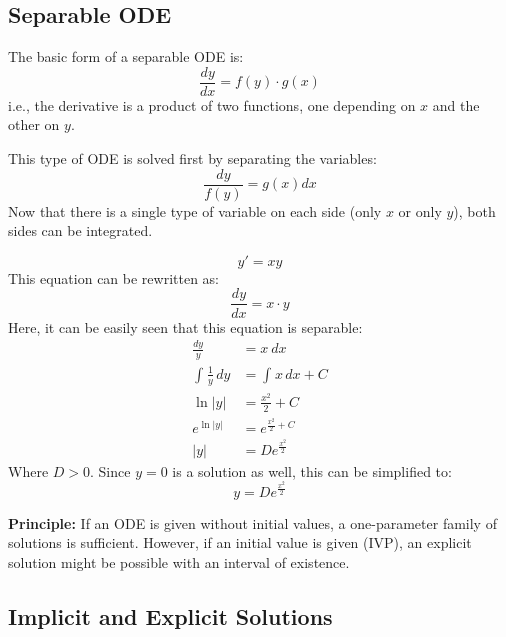 \documentclass[12pt]{article}
\begin{document}
\subsection{Separable ODE}
\label{ssec:separableODE}

The basic form of a separable ODE is:
\begin{equation*}
  \frac{dy}{dx} = f(y) \cdot g(x)
\end{equation*}
i.e., the derivative is a product of two functions, one depending on $x$ and the other on $y$.

This type of ODE is solved first by separating the variables:
\begin{equation*}
  \frac{dy}{f(y)} = g(x) dx
\end{equation*}
Now that there is a single type of variable on each side (only $x$ or only $y$), both sides can be integrated.

\begin{example}
  \begin{equation*}
    y' = xy
  \end{equation*}
  This equation can be rewritten as:
  \begin{equation*}
    \frac{dy}{dx} = x \cdot y
  \end{equation*}
  Here, it can be easily seen that this equation is separable:
  \begin{align*}
    \frac{dy}{y} &= x\ dx \\
    \int_{}^{} \frac{1}{y} \, dy &= \int_{}^{} x \, dx + C \\
    \ln|y| &= \frac{x^2}{2} + C \\
    e^{\ln|y|} &= e^{\frac{x^2}{2} + C} \\
    |y| &= De^{\frac{x^2}{2}}
  \end{align*}
  Where $D>0$. Since $y=0$ is a solution as well, this can be simplified to:
  \begin{equation*}
    y = De^{\frac{x^2}{2}}
  \end{equation*}
\end{example}

\textbf{Principle:} If an ODE is given without initial values, a one-parameter family of solutions is sufficient. However, if an initial value is given (IVP), an explicit solution might be possible with an interval of existence.

\subsection{Implicit and Explicit Solutions}
\label{ssec:implicitAndExplicitSolutions}
\end{document}
